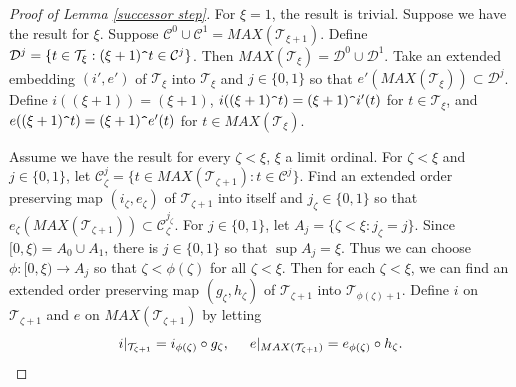 \documentclass[12pt]{amsart}
\theoremstyle{definition}
\newcommand{\ddd}{\mathcal{D}}
\newcommand{\ccc}{\mathcal{C}}
\newcommand{\ttt}{\mathcal{T}}
\begin{document}
\begin{proof}[Proof of Lemma \ref{successor step}] For $\xi=1$, the result is trivial.  Suppose we have the result for $\xi$.  Suppose $\ccc^0\cup \ccc^1=MAX(\ttt_{\xi+1})$.  Define $\ddd^j=\{t\in \ttt_\xi: (\xi+1)\verb!^!t\in \ccc^j\}$.  Then $MAX(\ttt_\xi)= \ddd^0\cup \ddd^1$.  Take an extended embedding $(i',e')$ of $\ttt_\xi$ into $\ttt_\xi$ and $j\in \{0,1\}$ so that $e'(MAX(\ttt_\xi))\subset \ddd^j$.  Define $i((\xi+1))=(\xi+1)$, $i((\xi+1)\verb!^!t)= (\xi+1)\verb!^!i'(t)$ for $t\in \ttt_\xi$, and  $e((\xi+1)\verb!^!t)=(\xi+1)\verb!^!e'(t)$ for $t\in MAX(\ttt_\xi)$.  

Assume we have the result for every $\zeta<\xi$, $\xi$ a limit ordinal. For $\zeta<\xi$ and $j\in \{0,1\}$, let $\ccc^j_\zeta=\{t\in MAX(\ttt_{\zeta+1}): t\in \ccc^j\}$.  Find an extended order preserving map $(i_\zeta, e_\zeta)$ of $\ttt_{\zeta+1}$ into itself and $j_\zeta\in \{0,1\}$ so that $e_\zeta(MAX(\ttt_{\zeta+1}))\subset \ccc^{j_\zeta}_\zeta$.  For $j\in \{0,1\}$, let $A_j=\{\zeta<\xi: j_\zeta=j\}$.  Since $[0,\xi)=A_0\cup A_1$, there is $j\in\{0,1\}$ so that $\sup A_j= \xi$.  Thus we can choose $\phi:[0,\xi)\to A_j$ so that $ \zeta<\phi(\zeta)$ for all $\zeta<\xi$.  Then for each $\zeta<\xi$, we can find an extended order preserving map $(g_\zeta, h_\zeta)$ of $\ttt_{\zeta+1}$ into $\ttt_{\phi(\zeta)+1}$.  Define $i$ on $\ttt_{\zeta+1}$ and $e$ on $MAX(\ttt_{\zeta+1})$ by letting $$i|_{\ttt_{\zeta+1}}=  i_{\phi(\zeta)}\circ g_\zeta, \hspace{5mm} e|_{MAX(\ttt_{\zeta+1})} = e_{\phi(\zeta)}\circ h_\zeta.$$  



\end{proof}
\end{document}
